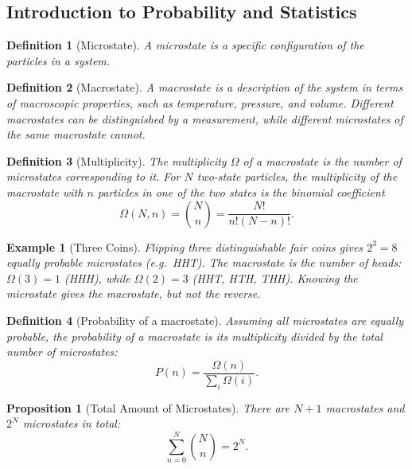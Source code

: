 \documentclass{article}
\newtheorem{definition}{Definition}
\newtheorem{example}{Example}
\newtheorem{proposition}{Proposition}
\begin{document}
\subsection{Introduction to Probability and Statistics}
\begin{definition}[Microstate]
    A microstate is a specific configuration of the particles in a system.
\end{definition}
\begin{definition}[Macrostate]
    A macrostate is a description of the system in terms of macroscopic properties, such as temperature, pressure, and volume. Different macrostates can be distinguished by a measurement, while different microstates of the same macrostate cannot.
\end{definition}
\begin{definition}[Multiplicity]
    The multiplicity $\Omega$ of a macrostate is the number of microstates corresponding to it. For $N$ two-state particles, the multiplicity of the macrostate with $n$ particles in one of the two states is the binomial coefficient
    \begin{equation}
        \Omega(N, n) = \binom{N}{n} = \frac{N!}{n!(N-n)!}.
    \end{equation}
\end{definition}
\begin{example}[Three Coins]
    Flipping three distinguishable fair coins gives $2^3 = 8$ equally probable microstates (e.g.\ HHT). The macrostate is the number of heads: $\Omega(3) = 1$ (HHH), while $\Omega(2) = 3$ (HHT, HTH, THH). Knowing the microstate gives the macrostate, but not the reverse.
\end{example}
\begin{definition}[Probability of a macrostate]
    Assuming all microstates are equally probable, the probability of a macrostate is its multiplicity divided by the total number of microstates:
    \begin{equation}
        P(n) = \frac{\Omega(n)}{\sum_i \Omega(i)}.
    \end{equation}
\end{definition}
\begin{proposition}[Total Amount of Microstates]
    There are $N+1$ macrostates and $2^N$ microstates in total:
    \begin{equation}
        \sum_{n=0}^{N} \binom{N}{n} = 2^N.
    \end{equation}
\end{proposition}
\end{document}
